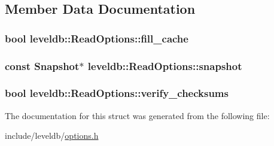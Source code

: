 \subsection{Member Data Documentation}
\hypertarget{structleveldb_1_1_read_options_a49f3754f8838596148ed5cbf9bbf8664}{
\subsubsection[{fill\-\_\-cache}]{\setlength{\rightskip}{0pt plus 5cm}bool leveldb\-::\-Read\-Options\-::fill\-\_\-cache}}\label{structleveldb_1_1_read_options_a49f3754f8838596148ed5cbf9bbf8664}
\hypertarget{structleveldb_1_1_read_options_a1fa3fffc267dff89fce7c39d7c7b5b50}{
\subsubsection[{snapshot}]{\setlength{\rightskip}{0pt plus 5cm}const {\bf Snapshot}$\ast$ leveldb\-::\-Read\-Options\-::snapshot}}\label{structleveldb_1_1_read_options_a1fa3fffc267dff89fce7c39d7c7b5b50}
\hypertarget{structleveldb_1_1_read_options_a43731d67b707995e20571ad33c1f53f2}{
\subsubsection[{verify\-\_\-checksums}]{\setlength{\rightskip}{0pt plus 5cm}bool leveldb\-::\-Read\-Options\-::verify\-\_\-checksums}}\label{structleveldb_1_1_read_options_a43731d67b707995e20571ad33c1f53f2}


The documentation for this struct was generated from the following file\-:\begin{DoxyCompactItemize}
\item 
include/leveldb/\hyperlink{options_8h}{options.\-h}\end{DoxyCompactItemize}

